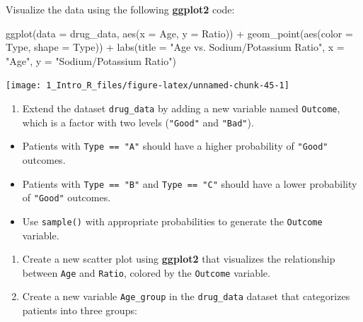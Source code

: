 \documentclass[
  11pt,
]{book}
\makeatletter
\newenvironment{Shaded}{}{}
\newcommand{\AttributeTok}[1]{#1}
\newcommand{\FunctionTok}[1]{#1}
\newcommand{\NormalTok}[1]{#1}
\newcommand{\SpecialCharTok}[1]{\textcolor[rgb]{0.39,0.39,0.39}{#1}}
\newcommand{\StringTok}[1]{\textcolor[rgb]{0.39,0.39,0.39}{#1}}
\providecommand{\tightlist}{%
  \setlength{\itemsep}{0pt}\setlength{\parskip}{0pt}}
\newenvironment{kframe}{%
\medskip{}
\setlength{\fboxsep}{.8em}
 \def\at@end@of@kframe{}%
 \ifinner\ifhmode%
  \def\at@end@of@kframe{\end{minipage}}%
  \begin{minipage}{\columnwidth}%
 \fi\fi%
 \def\FrameCommand##1{\hskip\@totalleftmargin \hskip-\fboxsep
 \colorbox{shadecolor}{##1}\hskip-\fboxsep
     \hskip-\linewidth \hskip-\@totalleftmargin \hskip\columnwidth}%
 \MakeFramed {\advance\hsize-\width
   \@totalleftmargin\z@ \linewidth\hsize
   \@setminipage}}%
 {\par\unskip\endMakeFramed%
 \at@end@of@kframe}
\renewenvironment{Shaded}{\begin{kframe}}{\end{kframe}}
\theoremstyle{definition}
\theoremstyle{definition}
\theoremstyle{definition}
\theoremstyle{definition}
\theoremstyle{remark}
\makeatother
\begin{document}
Visualize the data using the following \textbf{ggplot2} code:

\begin{Shaded}
\begin{Highlighting}[]
\FunctionTok{ggplot}\NormalTok{(}\AttributeTok{data =}\NormalTok{ drug\_data, }\FunctionTok{aes}\NormalTok{(}\AttributeTok{x =}\NormalTok{ Age, }\AttributeTok{y =}\NormalTok{ Ratio)) }\SpecialCharTok{+}
  \FunctionTok{geom\_point}\NormalTok{(}\FunctionTok{aes}\NormalTok{(}\AttributeTok{color =}\NormalTok{ Type, }\AttributeTok{shape =}\NormalTok{ Type)) }\SpecialCharTok{+} 
  \FunctionTok{labs}\NormalTok{(}\AttributeTok{title =} \StringTok{"Age vs. Sodium/Potassium Ratio"}\NormalTok{, }
       \AttributeTok{x =} \StringTok{"Age"}\NormalTok{, }\AttributeTok{y =} \StringTok{"Sodium/Potassium Ratio"}\NormalTok{)}
\end{Highlighting}
\end{Shaded}

\begin{center}\texttt{[image: 1\_Intro\_R\_files/figure-latex/unnamed-chunk-45-1]} \end{center}

\begin{enumerate}
\def\labelenumi{\arabic{enumi}.}
\setcounter{enumi}{17}
\tightlist
\item
  Extend the dataset \texttt{drug\_data} by adding a new variable named \texttt{Outcome}, which is a factor with two levels (\texttt{"Good"} and \texttt{"Bad"}).\\
\end{enumerate}

\begin{itemize}
\tightlist
\item
  Patients with \texttt{Type\ ==\ "A"} should have a higher probability of \texttt{"Good"} outcomes.\\
\item
  Patients with \texttt{Type\ ==\ "B"} and \texttt{Type\ ==\ "C"} should have a lower probability of \texttt{"Good"} outcomes.\\
\item
  Use \texttt{sample()} with appropriate probabilities to generate the \texttt{Outcome} variable.\\
\end{itemize}

\begin{enumerate}
\def\labelenumi{\arabic{enumi}.}
\setcounter{enumi}{18}
\tightlist
\item
  Create a new scatter plot using \textbf{ggplot2} that visualizes the relationship between \texttt{Age} and \texttt{Ratio}, colored by the \texttt{Outcome} variable.
\item
  Create a new variable \texttt{Age\_group} in the \texttt{drug\_data} dataset that categorizes patients into three groups:\\
\end{enumerate}
\end{document}

